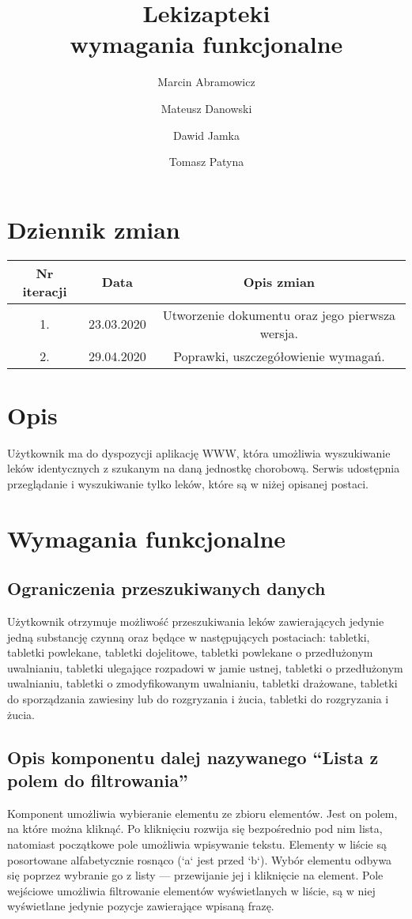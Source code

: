 \documentclass{article}
\title{
Lekizapteki\\
\large wymagania funkcjonalne}
\author{Marcin Abramowicz \and Mateusz Danowski \and Dawid Jamka \and Tomasz Patyna}
\begin{document}
  \setlength{\parindent}{0in}
  \maketitle

  \section{Dziennik zmian}
  \begin{tabular}{|c|c|c|}
    Nr iteracji & Data & Opis zmian \\
    \hline
    1. & 23.03.2020 & Utworzenie dokumentu oraz jego pierwsza wersja. \\
    \hline
    2. & 29.04.2020 & Poprawki, uszczegółowienie wymagań.
  \end{tabular}

  \section{Opis}
  Użytkownik ma do dyspozycji aplikację WWW, która umożliwia wyszukiwanie leków identycznych z szukanym na daną jednostkę chorobową.
  Serwis udostępnia przeglądanie i wyszukiwanie tylko leków, które są w niżej opisanej postaci.

  \section{Wymagania funkcjonalne}
    \subsection{Ograniczenia przeszukiwanych danych}
    Użytkownik otrzymuje możliwość przeszukiwania leków zawierających jedynie jedną substancję czynną oraz będące w następujących postaciach:
    tabletki,
    tabletki powlekane,
    tabletki dojelitowe,
    tabletki powlekane o przedłużonym uwalnianiu,
    tabletki ulegające rozpadowi w jamie ustnej,
    tabletki o przedłużonym uwalnianiu,
    tabletki o zmodyfikowanym uwalnianiu,
    tabletki drażowane,
    tabletki do sporządzania zawiesiny lub do rozgryzania i żucia,
    tabletki do rozgryzania i żucia.

    \subsection{Opis komponentu dalej nazywanego ``Lista z polem do filtrowania''}
    Komponent umożliwia wybieranie elementu ze zbioru elementów.
    Jest on polem, na które można kliknąć.
    Po kliknięciu rozwija się bezpośrednio pod nim lista, natomiast początkowe pole umożliwia wpisywanie tekstu.
    Elementy w liście są posortowane alfabetycznie rosnąco (`a` jest przed `b`).
    Wybór elementu odbywa się poprzez wybranie go z listy — przewijanie jej i kliknięcie na element.
    Pole wejściowe umożliwia filtrowanie elementów wyświetlanych w liście, są w niej wyświetlane jedynie pozycje zawierające wpisaną frazę.
\end{document}
